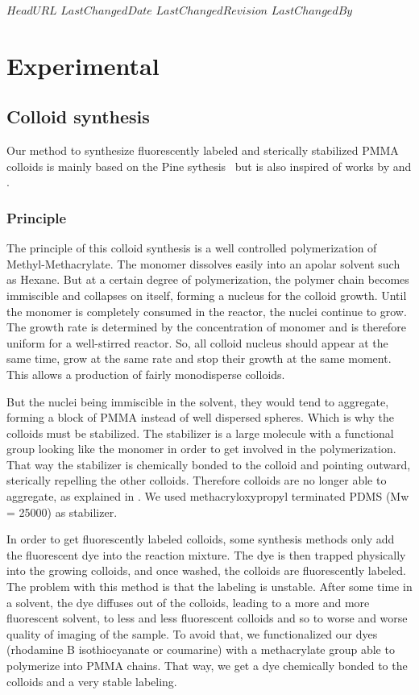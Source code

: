 \svnidlong
{$HeadURL$}
{$LastChangedDate$}
{$LastChangedRevision$}
{$LastChangedBy$}

\chapter{Experimental}
\label{ch:Experimental}


\section{Colloid synthesis}
\label{sec:synthesis}

Our method to synthesize fluorescently labeled and sterically stabilized \ac{PMMA} colloids is mainly based on the Pine sythesis~\citep{klein2003} but is also inspired of works by \citet{antl1986} and \citet{bosma2002}.


\subsection{Principle}

The principle of this colloid synthesis is a well controlled polymerization of Methyl-Methacrylate. The monomer dissolves easily into an apolar solvent such as Hexane. But at a certain degree of polymerization, the polymer chain becomes immiscible and collapses on itself, forming a nucleus for the colloid growth. Until the monomer is completely consumed in the reactor, the nuclei continue to grow. The growth rate is determined by the concentration of monomer and is therefore uniform for a well-stirred reactor. So, all colloid nucleus should appear at the same time, grow at the same rate and stop their growth at the same moment. This allows a production of fairly monodisperse colloids.

But the nuclei being immiscible in the solvent, they would tend to aggregate, forming a block of \ac{PMMA} instead of well dispersed spheres. Which is why the colloids must be stabilized. The stabilizer is a large molecule with a functional group looking like the monomer in order to get involved in the polymerization. That way the stabilizer is chemically bonded to the colloid and pointing outward, sterically repelling the other colloids. Therefore colloids are no longer able to aggregate, as explained in . We used methacryloxypropyl terminated \ac{PDMS} (Mw = \unit{25000}{\gram\per\mole}) as stabilizer.

In order to get fluorescently labeled colloids, some synthesis methods only add the fluorescent dye into the reaction mixture. The dye is then trapped physically into the growing colloids, and once washed, the colloids are fluorescently labeled. The problem with this method is that the labeling is unstable. After some time in a solvent, the dye diffuses out of the colloids, leading to a more and more fluorescent solvent, to less and less fluorescent colloids and so to worse and worse quality of imaging of the sample. To avoid that, we functionalized our dyes (rhodamine B isothiocyanate or coumarine) with a methacrylate group able to polymerize into \ac{PMMA} chains. That way, we get a dye chemically bonded to the colloids and a very stable labeling.


